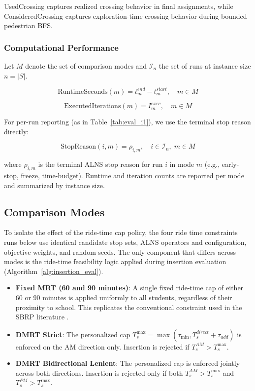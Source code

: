 \documentclass[journal]{IEEEtran}
\begin{document}
UsedCrossing captures realized crossing behavior in final assignments,
while ConsideredCrossing captures exploration-time crossing behavior
during bounded pedestrian BFS.

\subsubsection{Computational Performance}

Let $M$ denote the set of comparison modes and $\mathcal{I}_n$ the set
of runs at instance size $n=|S|$.

\begin{equation}
\text{RuntimeSeconds}(m) = t^{end}_m - t^{start}_m, \quad m \in M
\end{equation}

\begin{equation}
\text{ExecutedIterations}(m) = I^{exec}_m, \quad m \in M
\end{equation}

For per-run reporting (as in Table~\ref{tab:eval_i1}), we use the
terminal stop reason directly:

\begin{equation}
\text{StopReason}(i,m)=\rho_{i,m},\quad i\in\mathcal{I}_n,\; m\in M
\end{equation}

where $\rho_{i,m}$ is the terminal ALNS stop reason for run $i$ in mode $m$
(e.g., early-stop, freeze, time-budget). Runtime and iteration
counts are reported per mode and summarized by instance size.

\subsection{Comparison Modes}

To isolate the effect of the ride-time cap policy, the four ride time constraints runs below use identical candidate stop sets, ALNS operators and 
configuration, objective weights, and random seeds. The only 
component that differs across modes is the ride-time feasibility 
logic applied during insertion evaluation 
(Algorithm~\ref{alg:insertion_eval}).

\begin{itemize}

\item \textbf{Fixed MRT (60 and 90 minutes)}: A single fixed ride-time cap 
of either 60 or 90 minutes is applied uniformly to all students, 
regardless of their proximity to school. This replicates the 
conventional constraint used in the SBRP literature \cite{c3}.

\item \textbf{DMRT Strict}: The personalized cap 
$T_s^{\max} = \max(\tau_{\min}, T^{direct}_s + \tau_{add})$ is 
enforced on the AM direction only. Insertion is rejected if 
$T_s^{AM} > T_s^{\max}$.

\item \textbf{DMRT Bidirectional Lenient}: The personalized cap 
is enforced jointly across both directions. Insertion is rejected 
only if both $T_s^{AM} > T_s^{\max}$ and $T_s^{PM} > T_s^{\max}$.

\end{itemize}
\end{document}
